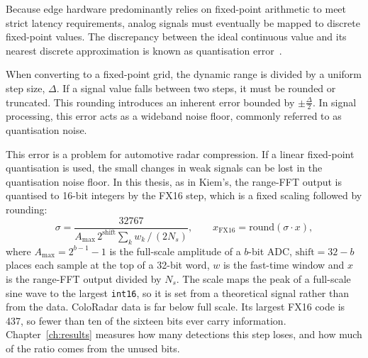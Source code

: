 Because edge hardware predominantly relies on fixed-point arithmetic to meet strict latency requirements, analog signals must eventually be mapped to discrete fixed-point values. The discrepancy between the ideal continuous value and its nearest discrete approximation is known as quantisation error~\cite{widrow2008}.

When converting to a fixed-point grid, the dynamic range is divided by a uniform step size, $\Delta$. If a signal value falls between two steps, it must be rounded or truncated. This rounding introduces an inherent error bounded by $\pm \frac{\Delta}{2}$. In signal processing, this error acts as a wideband noise floor, commonly referred to as quantisation noise.

This error is a problem for automotive radar compression. If a linear
fixed-point quantisation is used, the small changes in weak signals can be lost
in the quantisation noise floor. In this thesis, as in Kiem's, the range-FFT
output is quantised to 16-bit integers by the FX16 step, which is a fixed
scaling followed by rounding:
\begin{equation}
\label{eq:scale}
\sigma = \frac{32767}{A_{\max}\,2^{\mathrm{shift}} \sum_k w_k \,/\, (2 N_s)},
\qquad
x_{\mathrm{FX16}} = \mathrm{round}(\sigma \cdot x),
\end{equation}
where $A_{\max} = 2^{b-1}-1$ is the full-scale amplitude of a $b$-bit ADC,
$\mathrm{shift} = 32 - b$ places each sample at the top of a 32-bit word, $w$
is the fast-time window and $x$ is the range-FFT output divided by $N_s$. The
scale maps the peak of a full-scale sine wave to the largest \texttt{int16}, so
it is set from a theoretical signal rather than from the data. ColoRadar data
is far below full scale. Its largest FX16 code is \num{437}, so fewer than ten
of the sixteen bits ever carry information. Chapter~\ref{ch:results} measures
how many detections this step loses, and how much of the ratio comes from the
unused bits.
